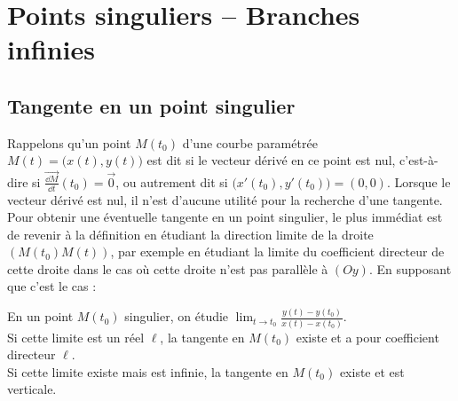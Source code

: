 \documentclass[class=report,crop=false]{standalone}
\begin{document}
\section{Points singuliers -- Branches infinies}


\subsection{Tangente en un point singulier}


Rappelons qu'un point $M(t_0)$ d'une courbe paramétrée $M(t) = \big( x(t),y(t)\big)$
est dit  si le vecteur dérivé en ce point est nul,
c'est-à-dire si $\overrightarrow{\frac{\dd M}{\dd t}}(t_0)=\vec{0}$,
ou autrement dit si $\big( x'(t_0), y'(t_0)\big) = (0,0)$.
Lorsque le vecteur dérivé est nul, il n'est d'aucune utilité pour
la recherche d'une tangente.
Pour obtenir une éventuelle tangente en un point singulier,
le plus immédiat est de revenir à la définition en étudiant
la direction limite de la droite $(M(t_0)M(t))$, par exemple
en étudiant la limite du coefficient directeur de cette droite
dans le cas où cette droite n'est pas parallèle à $(Oy)$.
En supposant que c'est le cas :

\mybox
{
\begin{minipage}{0.7\textwidth}
\begin{center}
En un point $M(t_0)$ singulier, on étudie
$\displaystyle \lim_{t\rightarrow t_0}\frac{y(t)-y(t_0)}{x(t)-x(t_0)}$.\\
Si cette limite est un réel $\ell$, la tangente en $M(t_0)$
existe et a pour coefficient directeur $\ell$.\\
Si cette limite existe mais est infinie, la tangente en $M(t_0)$
existe et est verticale.
\end{center}
\end{minipage}
}
\end{document}
